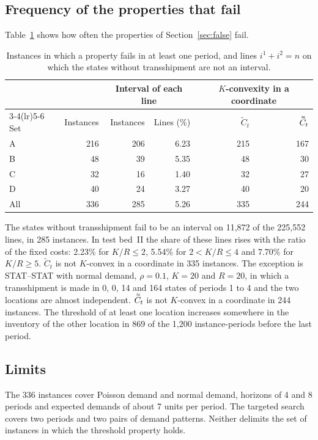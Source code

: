 \documentclass[11pt]{article}
\DeclareRobustCommand{\dbtilde}[1]{\accentset{\approx}{#1}}
\newcommand{\Ct}{\widetilde{C}}
\newcommand{\Cq}{\dbtilde{C}}
\theoremstyle{definition}
\begin{document}
\subsection{Frequency of the properties that fail}

Table~\ref{tab:fail} shows how often the properties of Section~\ref{sec:false} fail.

\begin{table}[h]
\centering
\small
\setlength{\tabcolsep}{5pt}
\caption{Instances in which a property fails in at least one period, and lines $i^1+i^2=n$ on which the states without transshipment are not an interval.}\label{tab:fail}
\begin{tabular}{lrrrrr}
\toprule
 & & \multicolumn{2}{c}{Interval of each line} & \multicolumn{2}{c}{$K$-convexity in a coordinate} \\
\cmidrule(lr){3-4}\cmidrule(lr){5-6}
Set & Instances & Instances & Lines (\%) & $\Ct_t$ & $\Cq_t$ \\
\midrule
A & 216 & 206 & 6.23 & 215 & 167 \\
B & 48 & 39 & 5.35 & 48 & 30 \\
C & 32 & 16 & 1.40 & 32 & 27 \\
D & 40 & 24 & 3.27 & 40 & 20 \\
\midrule
All & 336 & 285 & 5.26 & 335 & 244 \\
\bottomrule
\end{tabular}
\end{table}

The states without transshipment fail to be an interval on 11,872 of the 225,552 lines, in 285 instances. In test bed~II the share of these lines rises with the ratio of the fixed costs: 2.23\% for $K/R\le2$, 5.54\% for $2<K/R\le4$ and 7.70\% for $K/R\ge5$. $\Ct_t$ is not $K$-convex in a coordinate in 335 instances. The exception is STAT--STAT with normal demand, $\rho=0.1$, $K=20$ and $R=20$, in which a transshipment is made in 0, 0, 14 and 164 states of periods 1 to 4 and the two locations are almost independent. $\Cq_t$ is not $K$-convex in a coordinate in 244 instances. The threshold of at least one location increases somewhere in the inventory of the other location in 869 of the 1,200 instance-periods before the last period.

\subsection{Limits}

The 336 instances cover Poisson demand and normal demand, horizons of 4 and 8 periods and expected demands of about 7 units per period. The targeted search covers two periods and two pairs of demand patterns. Neither delimits the set of instances in which the threshold property holds.
\end{document}
